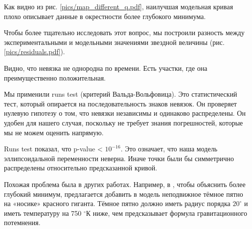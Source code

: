 

\label{sect:RunsTest}

Как видно из рис. \ref{pics/map_different_q.pdf}, наилучшая модельная кривая плохо описывает данные в окрестности более глубокого минимума.

Чтобы более тщательно исследовать этот вопрос, мы построили разность между экспериментальными и модельными значениями звездной величины (рис. \ref{pics/residuals.pdf}).

Видно, что невязка не однородна по времени. Есть участки, где она преимущественно положительная.


Мы применили runs test (критерий Вальда-Вольфовица). Это статистический тест, который опирается на последовательность знаков невязок. Он проверяет нулевую гипотезу о том, что невязки независимы и одинаково распределены. Он удобен для нашего случая, поскольку не требует знания погрешностей, которые мы не можем оценить напрямую.

Runs test показал, что p-value < $10^{-16}$. Это означает, что наша модель эллипсоидальной переменности неверна. Иначе точки были бы симметрично распределены относительно предсказанной кривой.

Похожая проблема была в других работах. Например, в \cite{Shanbaz}, чтобы объяснить более глубокий минимум, предлагается добавить в модель неподвижное тёмное пятно на «носике» красного гиганта. Тёмное пятно должно иметь радиус порядка $20^\circ$ и иметь температуру на 750 ${}^\circ$К ниже, чем предсказывает формула гравитационного потемнения.





